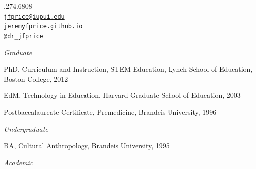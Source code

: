 \documentclass[11pt,article,oneside]{memoir}
\makeatletter
\def\myemail{jfprice@iupui.edu}
\def\myweb{jeremyfprice.github.io}
\def\myphone{1.317.274.6808}
\def\mytwitter{@dr\_jfprice}
\makeatother
\begin{document}
\begin{minipage}[t]{2.95in}
  
\end{minipage}
\hfill     
\hfill
\begin{minipage}[t]{1.3in}
  \flushright \footnotesize  \addressblock \myphone \, \faPhone \\ 
  {\scriptsize  \texttt{\href{mailto:\myemail}{\myemail}} \, \faEnvelope} \\
  {\scriptsize  \texttt{\href{\myweb}{\myweb}} \, \faGlobe} \\
  {\scriptsize  \texttt{\href{http://twitter.com/dr_jfprice}{\mytwitter}} \, \faTwitter } 
\end{minipage}

\medskip


\reversemarginpar

\bigskip




\noindent\emph{Graduate \vspace{0.01in}}

    

        \ind PhD, Curriculum and Instruction, STEM Education, Lynch School of Education, Boston College, 2012
    
    
    

        \ind EdM, Technology in Education, Harvard Graduate School of Education, 2003
    
    
    

        \ind Postbaccalaureate Certificate, Premedicine, Brandeis University, 1996
    
    
    
\bigskip

\noindent\emph{Undergraduate \vspace{0.01in}}

\ind BA, Cultural Anthropology, Brandeis University, 1995

 \bigskip


\medskip
\noindent\emph{Academic \vspace{0.01in}}
\end{document}
